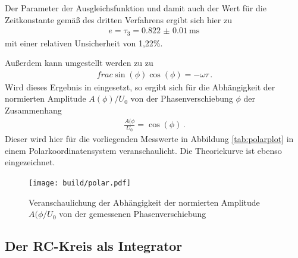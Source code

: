 Der Parameter der Ausgleichsfunktion und damit auch der Wert für die
Zeitkonstante gemäß des dritten Verfahrens ergibt sich hier zu
\begin{align}
  e = \tau_3 = \SI{0.822(0010)}{\milli\second}\,
\end{align}
mit einer relativen Unsicherheit von 1,22\%.

Außerdem kann umgestellt werden zu zu
\begin{align}
  frac{\sin(\phi)}{\cos(\phi)} = -ω\tau\,.
\end{align}
Wird dieses Ergebnis in  eingesetzt, so ergibt sich für die Abhängigkeit der normierten
Amplitude $A(\phi)/U_0$ von der Phasenverschiebung $\phi$ der Zusammenhang
\begin{align}
  \frac{A(\phi}{U_0} = \cos(\phi)\,.
\end{align}
Dieser wird hier für die vorliegenden Messwerte in Abbildung \ref{tab:polarplot} in einem
Polarkoordinatensystem veranschaulicht. Die Theoriekurve ist ebenso eingezeichnet.

\begin{figure}
  \centering
  \texttt{[image: build/polar.pdf]}
  \caption{Veranschaulichung der Abhängigkeit der normierten Amplitude $A(\phi/U_0$ von der gemessenen Phasenverschiebung}
  \label{fig:polarplot}
\end{figure}

\subsection{Der RC-Kreis als Integrator}

